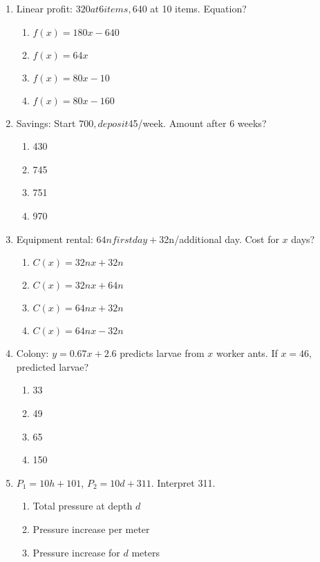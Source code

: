 \documentclass[12pt]{exam}
\begin{document}
\begin{enumerate}
    \item Linear profit: $320 at 6 items, $640 at 10 items. Equation?
    \begin{enumerate}[label=\Alph*)]
        \item $f(x) = 180x - 640$
        \item $f(x) = 64x$
        \item $f(x) = 80x - 10$
        \item $f(x) = 80x - 160$
    \end{enumerate}
    \item Savings: Start $700, deposit $45/week. Amount after 6 weeks?
    \begin{enumerate}[label=\Alph*)]
        \item 430
        \item 745
        \item 751
        \item 970
    \end{enumerate}
    \item Equipment rental: $64n first day + $32n/additional day. Cost for $x$ days?
    \begin{enumerate}[label=\Alph*)]
        \item $C(x) = 32nx + 32n$
        \item $C(x) = 32nx + 64n$
        \item $C(x) = 64nx + 32n$
        \item $C(x) = 64nx - 32n$
    \end{enumerate}
    \item Colony: $y = 0.67x + 2.6$ predicts larvae from $x$ worker ants. If $x = 46$, predicted larvae?
    \begin{enumerate}[label=\Alph*)]
        \item 33
        \item 49
        \item 65
        \item 150
    \end{enumerate}
    \item $P_1 = 10h + 101$, $P_2 = 10d + 311$. Interpret 311.
    \begin{enumerate}[label=\Alph*)]
        \item Total pressure at depth $d$
        \item Pressure increase per meter
        \item Pressure increase for $d$ meters

\end{enumerate}
\end{enumerate}
\end{document}
